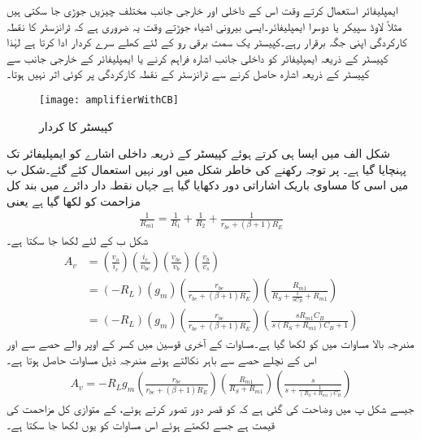 ایمپلیفائر استعمال کرتے وقت اس کے داخلی اور خارجی جانب مختلف چیزیں جوڑی جا سکتی ہیں مثلاً لاوڈ سپیکر یا دوسرا ایمپلیفائر۔ایسی بیرونی اشیاء جوڑتے وقت یہ ضروری ہے کہ ٹرانزسٹر کا نقطہ کارکردگی اپنی جگہ برقرار رہے۔کپیسٹر یک سمت برقی رو کے لئے کھلے سرے کردار ادا کرتا ہے لہٰذا کپیسٹر کے ذریعہ ایمپلیفائر کو داخلی جانب اشارہ فراہم کرنے یا ایمپلیفائر کے خارجی جانب سے کپیسٹر کے ذریعہ اشارہ حاصل کرنے سے ٹرانزسٹر کے نقطہ کارکردگی پر کوئی اثر نہیں ہوتا۔
\begin{figure}
\centering
\texttt{[image: amplifierWithCB]}
\caption{کپیسٹر  کا کردار}
\label{شکل_قابو_کپیسٹر_کا_کردار}
\end{figure}
شکل  الف میں ایسا ہی کرتے ہوئے کپیسٹر  کے ذریعہ داخلی اشارے کو ایمپلیفائر تک پہنچایا گیا ہے۔ پر توجہ رکھنے کی خاطر شکل میں  اور  نہیں استعمال کئے گئے۔شکل  ب میں اسی کا مساوی باریک اشاراتی دور دکھایا گیا ہے جہاں نقطہ دار دائرے میں بند کل مزاحمت کو  لکھا گیا ہے یعنی
\begin{align*}
\frac{1}{R_{m1}}=\frac{1}{R_1}+\frac{1}{R_2}+\frac{1}{r_{be}+\left(\beta+1 \right)R_E}
\end{align*}
شکل  ب کے لئے لکھا جا سکتا ہے۔
\begin{align*}
A_v&=\left( \frac{v_o}{i_c}\right ) \left( \frac{i_c}{v_{be}}\right ) \left( \frac{v_{be}}{v_b}\right ) \left( \frac{v_b}{v_s}\right )\\
&=\left(-R_L \right ) \left( g_m \right ) \left(\frac{r_{be}}{r_{be}+(\beta+1)R_E} \right ) \left(\frac{R_{m1}}{R_S+\frac{1}{s C_B}+R_{m1}} \right )\\
&=\left(-R_L \right ) \left(g_m \right ) \left(\frac{r_{be}}{r_{be}+(\beta+1)R_E} \right ) \left(\frac{s R_{m1} C_B}{s \left(R_S+R_{m1} \right ) C_B+1} \right )
\end{align*}
مندرجہ بالا مساوات میں  کو  لکھا گیا ہے۔مساوات کے آخری قوسین میں کسر کے اوپر والے حصے سے    اور اس کے نچلے حصے سے   باہر نکالتے ہوئے مندرجہ ذیل مساوات حاصل ہوتا ہے۔
\begin{align*}
A_v = -R_L  g_m  \left(\frac{r_{be}}{r_{be}+(\beta+1)R_E} \right ) \left (\frac{R_{m1}}{R_S+R_{m1}} \right ) \left(\frac{s}{s+\frac{1}{\left(R_S+R_{m1} \right )C_B}} \right )
\end{align*}
جیسے شکل  پ میں وضاحت کی گئی ہے کہ  کو قصر دور تصور کرتے ہوئے،  کے متوازی کل مزاحمت کی قیمت  ہے جسے   لکھتے ہوئے اس مساوات کو یوں لکھا جا سکتا ہے۔
